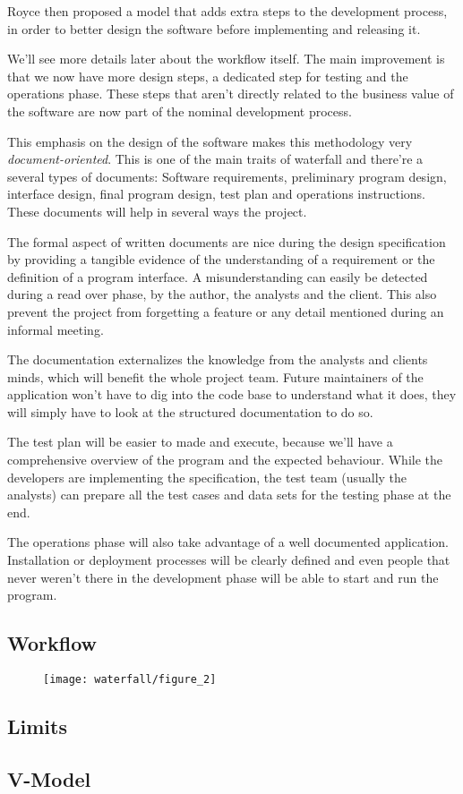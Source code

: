 Royce then proposed a model that adds extra steps to the development process,
in order to better design the software before implementing and releasing it.

We'll see more details later about the workflow itself.
The main improvement is that we now have more design steps, a dedicated step
for testing and the operations phase.
These steps that aren't directly related to the business value of the
software are now part of the nominal development process.

This emphasis on the design of the software makes this methodology very
\textit{document-oriented}.
This is one of the main traits of waterfall and there're a several types of
documents:
Software requirements, preliminary program design, interface design, final
program design, test plan and operations instructions.
These documents will help in several ways the project.

The formal aspect of written documents are nice during the design
specification by providing a tangible evidence of the understanding of a
requirement or the definition of a program interface.
A misunderstanding can easily be detected during a read over phase, by the
author, the analysts and the client.
This also prevent the project from forgetting a feature or any detail mentioned
during an informal meeting.

The documentation externalizes the knowledge from the analysts and clients
minds, which will benefit the whole project team.
Future maintainers of the application won't have to dig into the code base to
understand what it does, they will simply have to look at the structured
documentation to do so.

The test plan will be easier to made and execute, because we'll have a
comprehensive overview of the program and the expected behaviour.
While the developers are implementing the specification, the test team
(usually the analysts) can prepare all the test cases and data sets for the
testing phase at the end.

The operations phase will also take advantage of a well documented
application.
Installation or deployment processes will be clearly defined and even people
that never weren't there in the development phase will be able to start and
run the program.

\subsection{Workflow}\label{subsec:workflow}

\begin{figure}
    \texttt{[image: waterfall/figure\_2]}
    \centering
\end{figure}

\subsection{Limits}\label{subsec:limits}

\subsection{V-Model}\label{subsec:v-model}